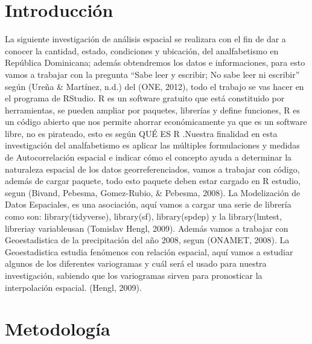 \documentclass[11pt,]{article}
\begin{document}
\vskip 6.5pt


\noindent  \section{Introducción}\label{introducciuxf3n}

La siguiente investigación de análisis espacial se realizara con el fin
de dar a conocer la cantidad, estado, condiciones y ubicación, del
analfabetismo en República Dominicana; además obtendremos los datos e
informaciones, para esto vamos a trabajar con la pregunta ``Sabe leer y
escribir; No sabe leer ni escribir'' según (Ureña \& Martínez, n.d.) del
(ONE, 2012), todo el trabajo se vas hacer en el programa de RStudio. R
es un software gratuito que está constituido por herramientas, se pueden
ampliar por paquetes, librerías y define funciones, R es un código
abierto que nos permite ahorrar económicamente ya que es un software
libre, no es pirateado, esto es según QUÉ ES R .Nuestra finalidad en
esta investigación del analfabetismo es aplicar las múltiples
formulaciones y medidas de Autocorrelación espacial e indicar cómo el
concepto ayuda a determinar la naturaleza espacial de los datos
georreferenciados, vamos a trabajar con código, además de cargar
paquete, todo esto paquete deben estar cargado en R estudio, segun
(Bivand, Pebesma, Gomez-Rubio, \& Pebesma, 2008). La Modelización de
Datos Espaciales, es una asociación, aquí vamos a cargar una serie de
librería como son: library(tidyverse), library(sf), library(spdep) y la
library(lmtest, libreriay variableusan (Tomislav Hengl, 2009). Además
vamos a trabajar con Geoestadistica de la precipitación del año 2008,
segun (ONAMET, 2008). La Geoestadistica estudia fenómenos con relación
espacial, aquí vamos a estudiar algunos de los diferentes variogramas y
cuál será el usado para nuestra investigación, sabiendo que los
variogramas sirven para pronosticar la interpolación espacial. (Hengl,
2009).

\section{Metodología}\label{metodologuxeda}
\end{document}
